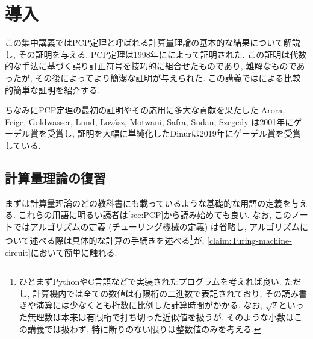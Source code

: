 \chapter{導入}

この集中講義ではPCP定理と呼ばれる計算量理論の基本的な結果について解説し, その証明を与える.
PCP定理は1998年に\citet{AroraS98,AroraLMSS98}によって証明された.
この証明は代数的な手法に基づく誤り訂正符号を技巧的に組合せたものであり, 難解なものであったが, その後\citet{Din07}によってより簡潔な証明が与えられた.
この講義では\citet{Din07}による比較的簡単な証明を紹介する.

ちなみにPCP定理の最初の証明やその応用に多大な貢献を果たした
Arora, Feige, Goldwasser, Lund, Lovász, Motwani, Safra, Sudan, Szegedy
は2001年にゲーデル賞を受賞し,
証明を大幅に単純化したDinurは2019年にゲーデル賞を受賞している.

\section{計算量理論の復習}
まずは計算量理論のどの教科書にも載っているような基礎的な用語の定義を与える. これらの用語に明るい読者は\cref{sec:PCP}から読み始めても良い.
なお, このノートではアルゴリズムの定義 (チューリング機械の定義) は省略し, アルゴリズムについて述べる際は具体的な計算の手続きを述べる\footnote{ひとまずPythonやC言語などで実装されたプログラムを考えれば良い. ただし, 計算機内では全ての数値は有限桁の二進数で表記されており, その読み書きや演算には少なくとも桁数に比例した計算時間がかかる. なお, $\sqrt{2}$といった無理数は本来は有限桁で打ち切った近似値を扱うが, そのような小数はこの講義では扱わず, 特に断りのない限りは整数値のみを考える.}が, \cref{claim:Turing-machine-circuit}において簡単に触れる.

